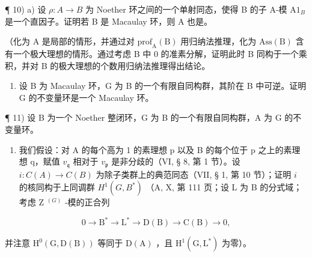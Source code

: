 ¶ 10) a) 设 \(\rho: A \to B\) 为 Noether 环之间的一个单射同态，使得 B 的子 A-模 \(\mathrm{A}1_{B}\) 是一个直因子。证明若 B 是 Macaulay 环，则 A 也是。

（化为 A 是局部的情形，并通过对 \(\mathrm{prof}_{\mathrm{A}}(\mathrm{B})\) 用归纳法推理，化为 \(\mathrm{Ass}(\mathrm{B})\) 含有一个极大理想的情形。通过考虑 B 中 0 的准素分解，证明此时 B 同构于一个乘积，并对 B 的极大理想的个数用归纳法推理得出结论。

\begin{enumerate}
\def\labelenumi{\alph{enumi})}
\setcounter{enumi}{1}
\tightlist
\item
  设 B 为 Macaulay 环，G 为 B 的一个有限自同构群，其阶在 B 中可逆。证明 G 的不变量环是一个 Macaulay 环。
\end{enumerate}

¶ 11) 设 B 为一个 Noether 整闭环，G 为 B 的一个有限自同构群，A 为 G 的不变量环。

\begin{enumerate}
\def\labelenumi{\alph{enumi})}
\tightlist
\item
  我们假设：对 \(\mathrm{A}\) 的每个高为 1 的素理想 p 以及 B 的每个位于 p 之上的素理想 q，赋值 \(v_{\mathfrak{q}}\) 相对于 \(v_{\mathfrak{p}}\) 是非分歧的（VI, § 8, 第 1 节）。设 \(i: C(A) \to C(B)\) 为除子类群上的典范同态（VII, § 1, 第 10 节）；证明 \(i\) 的核同构于上同调群 \(H^{1}(G,B^{*})\) （A, X, 第 111 页；设 L 为 B 的分式域；考虑 Z \(^{(G)}\) -模的正合列
\end{enumerate}

\[
0 \rightarrow \mathrm{B} ^ {*} \rightarrow \mathrm{L} ^ {*} \rightarrow \mathrm{D} (\mathrm{B}) \rightarrow \mathrm{C} (\mathrm{B}) \rightarrow 0,
\]

并注意 \(\mathrm{H}^{0}(\mathrm{G},\mathrm{D}(\mathrm{B}))\) 等同于 \(\mathrm{D}(\mathrm{A})\) ，且 \(\mathrm{H}^{1}(\mathrm{G},\mathrm{L}^{*})\) 为零）。


